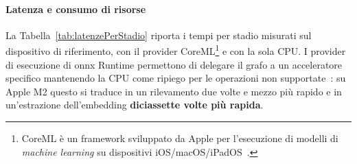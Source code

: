 \paragraph{Latenza e consumo di risorse}
La Tabella~\ref{tab:latenzePerStadio} riporta i tempi per stadio misurati sul dispositivo di riferimento, con il provider CoreML\footnote{CoreML è un framework sviluppato da Apple per l'esecuzione di modelli di \textit{machine learning} su dispositivi iOS/macOS/iPadOS~\cite{CoreMLApple}.} e con la sola CPU.
I provider di esecuzione di \gls{onnx} Runtime permettono di delegare il grafo a un acceleratore specifico mantenendo la CPU come ripiego per le operazioni non supportate~\cite{ONNXRuntime}: su Apple M2 questo si traduce in un rilevamento due volte e mezzo più rapido e in un'estrazione dell'embedding \textbf{diciassette volte più rapida}.

